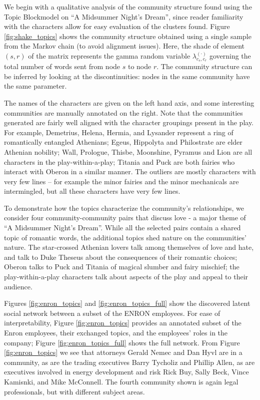         We begin with a qualitative analysis of the community structure found using the Topic Blockmodel on ``A Midsummer Night's Dream'', since reader familiarity with the characters allow for easy evaluation of the clusters found. Figure \ref{fig:shake_topics} shows the community structure obtained using a single sample from the Markov chain (to avoid alignment issues). Here, the shade of  element $(s,r)$ of the matrix represents the gamma random variable $\lambda_{c_s,c_r}^{(\cdot)}$ governing the total number of words sent from node $s$ to node $r$. The community structure can be inferred by looking at the discontinuities: nodes in the same community have the same parameter.
    
        The names of the characters are given on the left hand axis, and some interesting communities are manually annotated on the right. Note that the communities generated are fairly well aligned with the character groupings present in the play.  For example, Demetrius, Helena, Hermia, and Lysander represent a ring of romantically entangled Athenians;  Egeus, Hippolyta and Philostrate are elder Athenian nobility; Wall, Prologue, Thisbe, Moonshine, Pyramus and Lion are all characters in the play-within-a-play; Titania and Puck are both fairies who interact with Oberon in a similar manner. The outliers are mostly characters with very few lines -- for example the minor fairies and the minor mechanicals are intermingled, but all these characters have very few lines.
        
        To demonstrate how the topics characterize the community's relationships, we consider four community-community pairs that discuss love - a major theme of ``A Midsummer Night's Dream''. While all the selected pairs contain a shared topic of romantic words, the additional topics shed nature on the communities' nature. The star-crossed Athenian lovers talk among themselves of love and hate, and talk to Duke Theseus about the consequences of their romantic choices; Oberon talks to Puck and Titania of  magical slumber and fairy mischief; the play-within-a-play characters talk about aspects of the play and appeal to their audience.
        
        Figures \ref{fig:enron_topics} and \ref{fig:enron_topics_full} show the discovered latent social network between a subset of the ENRON employees.  For ease of interpretability, Figure \ref{fig:enron_topics} provides an annotated subset of the Enron employees, their exchanged topics, and the employees' roles in the company; Figure \ref{fig:enron_topics_full} shows the full network. From Figure \ref{fig:enron_topics} we see that attorneys Gerald Nemec and Dan Hyvl are in a community, as are the trading executives Barry Tycholiz and Phillip Allen, as are executives involved in energy development and risk Rick Buy, Sally Beck, Vince Kamisnki, and Mike McConnell.  The fourth community shown is again legal professionals, but with different subject areas.
        

